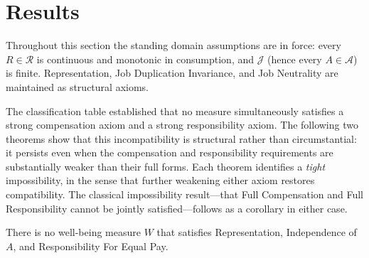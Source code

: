 %
%

\section{Results}

Throughout this section the standing domain assumptions are in force: every
$R\in\mathcal R$ is continuous and monotonic in consumption, and $\mathcal J$
(hence every $A\in\mathcal A$) is finite. Representation, Job Duplication
Invariance, and Job Neutrality are maintained as structural axioms.

The classification table established that no measure simultaneously satisfies a
strong compensation axiom and a strong responsibility axiom. The following two
theorems show that this incompatibility is structural rather than
circumstantial: it persists even when the compensation and responsibility
requirements are substantially weaker than their full forms. Each theorem
identifies a \emph{tight} impossibility, in the sense that further weakening
either axiom restores compatibility. The classical impossibility
result---that Full Compensation and Full Responsibility cannot be jointly
satisfied---follows as a corollary in either case.


\begin{theorem}
\label{thm:imp1}
There is no well-being measure $W$ that satisfies Representation, Independence
of $A$, and Responsibility For Equal Pay.
\end{theorem}


